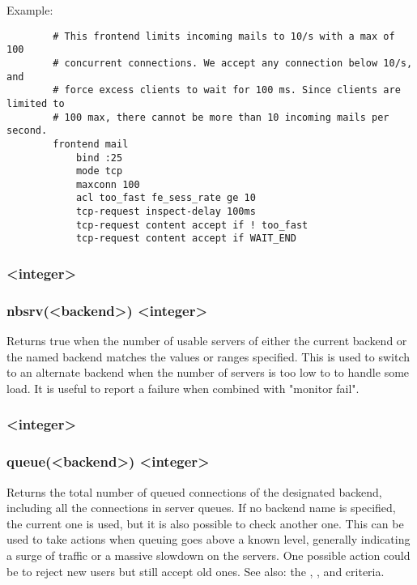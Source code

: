   Example:
  \begin{verbatim}
        # This frontend limits incoming mails to 10/s with a max of 100
        # concurrent connections. We accept any connection below 10/s, and
        # force excess clients to wait for 100 ms. Since clients are limited to
        # 100 max, there cannot be more than 10 incoming mails per second.
        frontend mail
            bind :25
            mode tcp
            maxconn 100
            acl too_fast fe_sess_rate ge 10
            tcp-request inspect-delay 100ms
            tcp-request content accept if ! too_fast
            tcp-request content accept if WAIT_END
  \end{verbatim}

\subsubsection[nbsrv]{ <integer>}
\subsubsection*{nbsrv(<backend>) <integer>}
  Returns true when the number of usable servers of either the current backend
  or the named backend matches the values or ranges specified. This is used to
  switch to an alternate backend when the number of servers is too low to
  to handle some load. It is useful to report a failure when combined with
  "monitor fail".

\subsubsection[queue]{ <integer>}
\subsubsection*{queue(<backend>) <integer>}
  Returns the total number of queued connections of the designated backend,
  including all the connections in server queues. If no backend name is
  specified, the current one is used, but it is also possible to check another
  one. This can be used to take actions when queuing goes above a known level,
  generally indicating a surge of traffic or a massive slowdown on the servers.
  One possible action could be to reject new users but still accept old ones.
  See also: the , , and  criteria.

\subsubsection[sc1\_bytes\_in\_rate]{}
